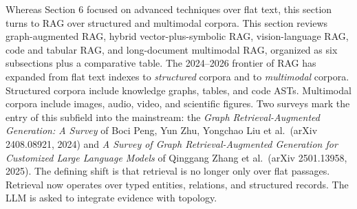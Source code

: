 \documentclass{article}
\begin{document}
Whereas Section 6 focused on advanced techniques over flat text, this section turns to RAG over structured and multimodal corpora. This section reviews graph-augmented RAG, hybrid vector-plus-symbolic RAG, vision-language RAG, code and tabular RAG, and long-document multimodal RAG, organized as six subsections plus a comparative table. The 2024--2026 frontier of RAG has expanded from flat text indexes to \emph{structured} corpora and to \emph{multimodal} corpora. Structured corpora include knowledge graphs, tables, and code ASTs. Multimodal corpora include images, audio, video, and scientific figures. Two surveys mark the entry of this subfield into the mainstream: the \emph{Graph Retrieval-Augmented Generation: A Survey} of Boci Peng, Yun Zhu, Yongchao Liu et al.~(arXiv 2408.08921, 2024) and \emph{A Survey of Graph Retrieval-Augmented Generation for Customized Large Language Models} of Qinggang Zhang et al.~(arXiv 2501.13958, 2025). The defining shift is that retrieval is no longer only over flat passages. Retrieval now operates over typed entities, relations, and structured records. The LLM is asked to integrate evidence with topology.
\end{document}

